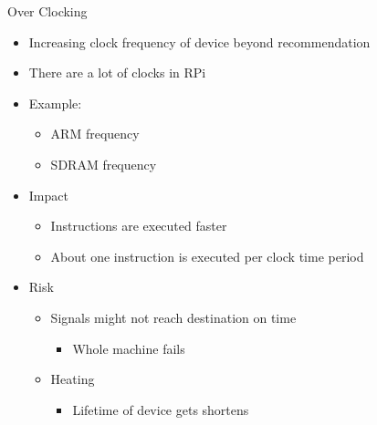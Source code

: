 \begin{frame}{Over Clocking}
	\begin{itemize}
		\item Increasing clock frequency of device beyond recommendation
		\item There are a lot of clocks in RPi
		\item Example:
		\begin{itemize}
			\item ARM frequency
			\item SDRAM frequency
		\end{itemize}
		\item Impact
		\begin{itemize}
			\item Instructions are executed faster
			\item About one instruction is executed per clock time period
		\end{itemize}
		\item Risk
		\begin{itemize}
			\item Signals might not reach destination on time
			\begin{itemize}
				\item Whole machine fails
			\end{itemize}
			\item Heating
			\begin{itemize}
				\item Lifetime of device gets shortens
			\end{itemize}
		\end{itemize}
	\end{itemize}
\end{frame}